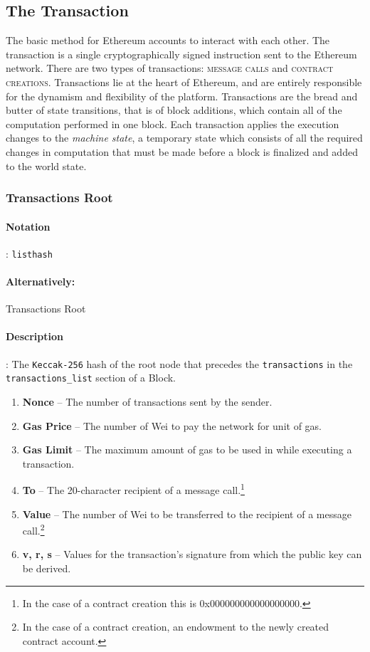 \documentclass[10pt,letterpaper,leqno,bibliography=totoc]{scrartcl}
\newenvironment{alphafootnotes}
{\par\edef\savedfootnotenumber{\number\value{footnote}}
\renewcommand{\thefootnote}{\alph{footnote}}
\setcounter{footnote}{0}}
{\par\setcounter{footnote}{\savedfootnotenumber}}
\begin{document}
\begin{alphafootnotes}
\begin{multicols*}{2}
					\subsection{The Transaction}
	
			The basic method for Ethereum accounts to interact with each other. The transaction is a single cryptographically signed instruction sent to the Ethereum network. There are two types of transactions: \textsc{message calls} and \textsc{contract creations}. Transactions lie at the heart of Ethereum, and are entirely responsible for the dynamism and flexibility of the platform. Transactions are the bread and butter of state transitions, that is of block additions, which contain all of the computation performed in one block. Each transaction applies the execution changes to the \textit{machine state}, a temporary state which consists of all the required changes in computation that must be made before a block is finalized and added to the world state.
		\subsubsection{Transactions Root}

			\paragraph{Notation}: \texttt{listhash}
			\paragraph{Alternatively:} Transactions Root
			\paragraph{Description}: The \texttt{Keccak-256} hash of the root node that precedes the \texttt{transactions} in the \texttt{transactions\_list} section of a Block.			
			
			\begin{enumerate}
				
				\item \textbf{Nonce} -- The number of transactions sent by the sender.
				\item \textbf{Gas Price} -- The number of Wei to pay the network for unit of gas.
				\item \textbf{Gas Limit} -- The maximum amount of gas to be used in while executing a transaction.			
				\item \textbf{To} -- The 20-character recipient of a message call.\footnote{In the case of a contract creation this is 0x000000000000000000.}
				\item \textbf{Value} -- The number of Wei to be transferred to the recipient of a message call.\footnote{In the case of a contract creation, an endowment to the newly created contract account.}
				\item \textbf{v, r, s} -- Values for the transaction's signature from which the public key can be derived.
			\end{enumerate}
			

\end{multicols*}
\end{alphafootnotes}
\end{document}
